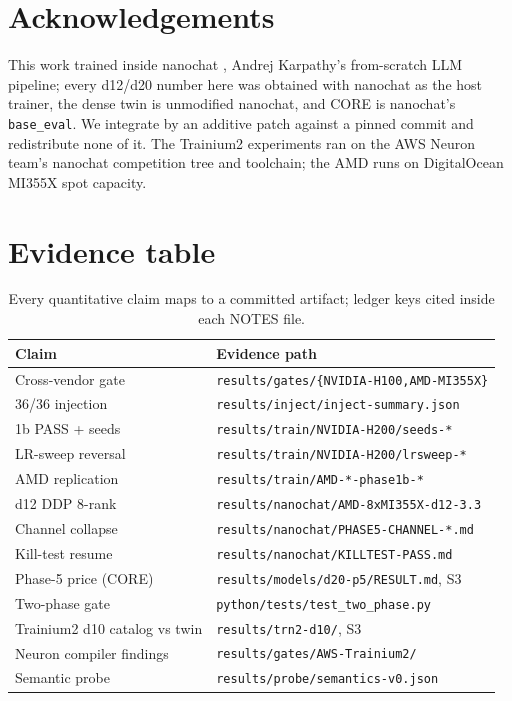 \documentclass[10pt,twocolumn]{article}
\begin{document}
\section*{Acknowledgements}
This work trained inside nanochat \cite{karpathy2025nanochat}, Andrej Karpathy's
from-scratch LLM pipeline; every d12/d20 number here was obtained with nanochat
as the host trainer, the dense twin is unmodified nanochat, and CORE is
nanochat's \texttt{base\_eval}. We integrate by an additive patch against a
pinned commit and redistribute none of it. The Trainium2 experiments ran on the
AWS Neuron team's nanochat competition tree and toolchain; the AMD runs on
DigitalOcean MI355X spot capacity.

\section{Evidence table}
\label{sec:evidence}

\begin{table}[h]
\scriptsize
\centering
\begin{tabular}{@{}ll@{}}
\toprule
Claim & Evidence path \\
\midrule
Cross-vendor gate & \texttt{results/gates/\{NVIDIA-H100,AMD-MI355X\}} \\
36/36 injection & \texttt{results/inject/inject-summary.json} \\
1b PASS + seeds & \texttt{results/train/NVIDIA-H200/seeds-*} \\
LR-sweep reversal & \texttt{results/train/NVIDIA-H200/lrsweep-*} \\
AMD replication & \texttt{results/train/AMD-*-phase1b-*} \\
d12 DDP 8-rank & \texttt{results/nanochat/AMD-8xMI355X-d12-3.3} \\
Channel collapse & \texttt{results/nanochat/PHASE5-CHANNEL-*.md} \\
Kill-test resume & \texttt{results/nanochat/KILLTEST-PASS.md} \\
Phase-5 price (CORE) & \texttt{results/models/d20-p5/RESULT.md}, S3 \\
Two-phase gate & \texttt{python/tests/test\_two\_phase.py} \\
Trainium2 d10 catalog vs twin & \texttt{results/trn2-d10/}, S3 \\
Neuron compiler findings & \texttt{results/gates/AWS-Trainium2/} \\
Semantic probe & \texttt{results/probe/semantics-v0.json} \\
\bottomrule
\end{tabular}
\caption{Every quantitative claim maps to a committed artifact; ledger keys
cited inside each NOTES file.}
\end{table}
\end{document}
